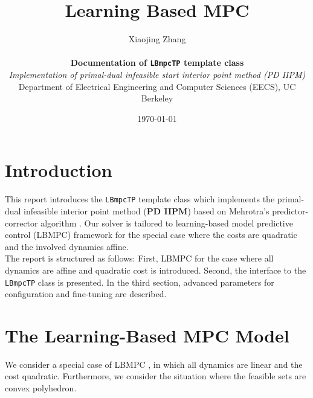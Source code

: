 \documentclass[letter]{article}
\date{\today}
\author{Xiaojing Zhang \\ \\
 	{\bf Documentation of \texttt{LBmpcTP} template class} \\
 	{\it Implementation of primal-dual infeasible start interior point method (PD IIPM)} \\
 	 Department of Electrical Engineering and Computer Sciences (EECS), UC Berkeley}
\title{Learning Based MPC}
\begin{document}
\pagestyle{headings}	%
\maketitle

\begin{sffamily}		%


\newcommand{\sinc}{\mathrm{sinc}}
\renewcommand{\thefootnote}{\fnsymbol{footnote}}

\section*{Introduction}
This report introduces the \texttt{LBmpcTP} template class which implements the primal-dual infeasible interior point method (\textbf{PD IIPM}) based on Mehrotra's predictor-corrector algorithm \citep{Mehrotra1992PDIPM}. Our solver is tailored to  learning-based model predictive control (LBMPC) framework \citep{Aswani2011LBMPC} for the special case where the costs are quadratic and the involved dynamics affine.\\

\noindent
The report is structured as follows: First, LBMPC for the case where all dynamics are affine and quadratic cost is introduced. Second, the interface to the \texttt{LBmpcTP} class is presented. In the third section, advanced parameters for configuration and fine-tuning are described.

\section{The Learning-Based MPC Model}
We consider a special case of LBMPC \citep{Aswani2011LBMPC}, in which all dynamics are linear and the cost quadratic. Furthermore, we consider the situation where the feasible sets are convex polyhedron. \\


\end{sffamily}
\end{document}
